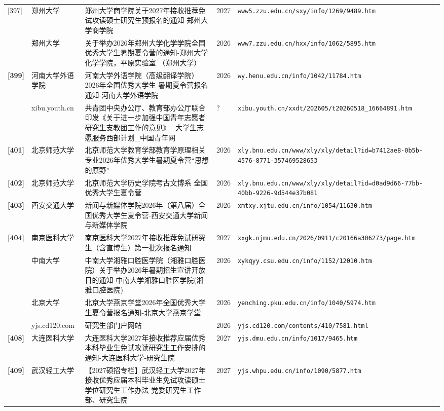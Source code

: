 {\begin{longtable}{@{}p{1.15cm}p{2.9cm}p{6.3cm}p{0.85cm}p{5.0cm}@{}}
[397] & 郑州大学 & 郑州大学商学院关于2027年接收推荐免试攻读硕士研究生预报名的通知-郑州大学商学院 & 2027 & \texttt{www5.zzu.edu.cn/sxy/info/1269/9489.htm} \\
[398] & 郑州大学 & 关于举办2026年郑州大学化学学院全国优秀大学生暑期夏令营的通知-郑州大学化学学院，平原实验室 （郑州大学） & 2026 & \texttt{www7.zzu.edu.cn/hxx/info/1062/5895.htm} \\
\textbf{[399]} & 河南大学外语学院 & 河南大学外语学院（高级翻译学院）2026年全国优秀大学生 暑期夏令营报名通知-河南大学外语学院 & 2026 & \texttt{wy.henu.edu.cn/info/1042/11784.htm} \\
[400] & xibu.youth.cn & 共青团中央办公厅、教育部办公厅联合印发《关于进一步加强中国青年志愿者研究生支教团工作的意见》\_大学生志愿服务西部计划\_中国青年网 & ? & \texttt{xibu.youth.cn/xxdt/202605/t20260518\_16664891.htm} \\
\textbf{[401]} & 北京师范大学 & 北京师范大学教育学部教育学原理相关专业2026年优秀大学生暑期夏令营“思想的原野” & 2026 & \texttt{xly.bnu.edu.cn/www/xly/xly/detail?id=b7412ae8-0b5b-4576-8771-357469528653} \\
\textbf{[402]} & 北京师范大学 & 北京师范大学历史学院考古文博系 全国优秀大学生夏令营 & 2026 & \texttt{xly.bnu.edu.cn/www/xly/xly/detail?id=d0ad9d66-77bb-40bb-9226-9d544e37b081} \\
\textbf{[403]} & 西安交通大学 & 新闻与新媒体学院2026年（第八届）全国优秀大学生夏令营-西安交通大学新闻与新媒体学院 & 2026 & \texttt{xmtxy.xjtu.edu.cn/info/1054/11630.htm} \\
\textbf{[404]} & 南京医科大学 & 南京医科大学2027年接收推荐免试研究生（含直博生）第一批次报名通知 & 2027 & \texttt{xxgk.njmu.edu.cn/2026/0911/c20166a306273/page.htm} \\
[405] & 中南大学 & 中南大学湘雅口腔医学院（湘雅口腔医院）关于举办2026年暑期招生宣讲开放日的通知-中南大学湘雅口腔医学院(湘雅口腔医院) & 2026 & \texttt{xykqyy.csu.edu.cn/info/1152/12010.htm} \\
[406] & 北京大学 & 北京大学燕京学堂2026年全国优秀大学生夏令营报名通知-北京大学燕京学堂 & 2026 & \texttt{yenching.pku.edu.cn/info/1040/5974.htm} \\
[407] & yjs.cd120.com & 研究生部门户网站 & 2026 & \texttt{yjs.cd120.com/contents/410/7581.html} \\
\textbf{[408]} & 大连医科大学 & 大连医科大学2027年接收推荐应届优秀本科毕业生免试攻读研究生工作安排的通知-大连医科大学-研究生院 & 2027 & \texttt{yjs.dmu.edu.cn/info/1017/9465.htm} \\
\textbf{[409]} & 武汉轻工大学 & 【2027硕招专栏】武汉轻工大学2027年接收优秀应届本科毕业生免试攻读硕士学位研究生工作办法-党委研究生工作部、研究生院 & 2027 & \texttt{yjs.whpu.edu.cn/info/1090/5877.htm} \\

\end{longtable}}

